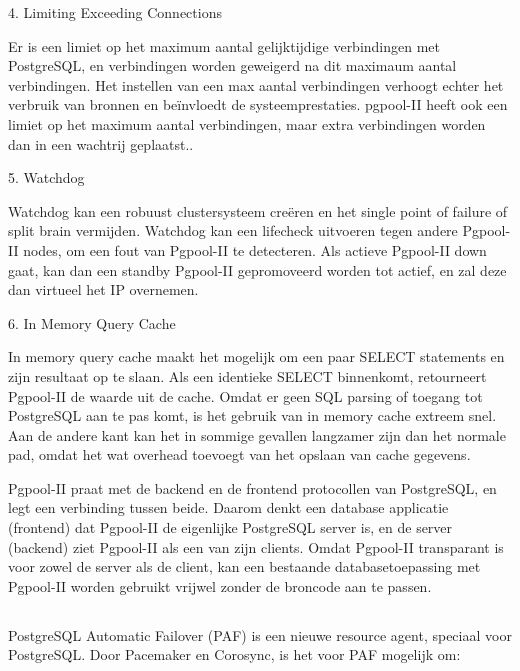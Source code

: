 4. Limiting Exceeding Connections

Er is een limiet op het maximum aantal gelijktijdige verbindingen met PostgreSQL, en verbindingen worden geweigerd na dit maximaum aantal verbindingen. Het instellen van een max aantal verbindingen verhoogt echter het verbruik van bronnen en beïnvloedt de systeemprestaties. pgpool-II heeft ook een limiet op het maximum aantal verbindingen, maar extra verbindingen worden dan in een wachtrij geplaatst..

5. Watchdog

Watchdog kan een robuust clustersysteem creëren en het single point of failure of split brain vermijden. Watchdog kan een lifecheck uitvoeren tegen andere Pgpool-II nodes, om een fout van Pgpool-II te detecteren. Als actieve Pgpool-II down gaat, kan dan een standby Pgpool-II gepromoveerd worden tot actief, en zal deze dan virtueel het IP overnemen.

6. In Memory Query Cache

In memory query cache maakt het mogelijk om een paar SELECT statements en zijn resultaat op te slaan. Als een identieke SELECT binnenkomt, retourneert Pgpool-II de waarde uit de cache. Omdat er geen SQL parsing of toegang tot PostgreSQL aan te pas komt, is het gebruik van in memory cache extreem snel. Aan de andere kant kan het in sommige gevallen langzamer zijn dan het normale pad, omdat het wat overhead toevoegt van het opslaan van cache gegevens.

Pgpool-II praat met de backend en de frontend protocollen van PostgreSQL, en legt een verbinding tussen beide. Daarom denkt een database applicatie (frontend) dat Pgpool-II de eigenlijke PostgreSQL server is, en de server (backend) ziet Pgpool-II als een van zijn clients. Omdat Pgpool-II transparant is voor zowel de server als de client, kan een bestaande databasetoepassing met Pgpool-II worden gebruikt vrijwel zonder de broncode aan te passen. %


\subsection{}
\label{subsec:PostgreSQL Automatic Failover (PAF)}

PostgreSQL Automatic Failover (PAF) is een nieuwe resource agent, speciaal voor PostgreSQL. Door Pacemaker en Corosync, is het voor PAF mogelijk om:

